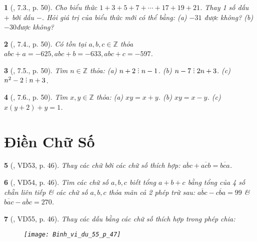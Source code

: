 \documentclass{article}
\newtheorem{baitoan}{}
\DeclareRobustCommand{\divby}{%
	\mathrel{\vbox{\baselineskip.65ex\lineskiplimit0pt\hbox{.}\hbox{.}\hbox{.}}}%
}
\begin{document}
\begin{baitoan}[\cite{TLCT_THCS_Toan_6_so_hoc}, 7.3., p. 50]
	Cho biểu thức $1 + 3 + 5 + 7 + \cdots + 17 + 19 + 21$. Thay 1 số dấu $+$ bởi dấu $-$. Hỏi giá trị của biểu thức mới có thể bằng: (a) $-31$ được không? (b) $-30$được không?
\end{baitoan}

\begin{baitoan}[\cite{TLCT_THCS_Toan_6_so_hoc}, 7.4., p. 50]
	Có tồn tại $a,b,c\in\mathbb{Z}$ thỏa $abc + a = -625,abc + b = -633,abc + c = -597$.
\end{baitoan}

\begin{baitoan}[\cite{TLCT_THCS_Toan_6_so_hoc}, 7.5., p. 50]
	Tìm $n\in\mathbb{Z}$ thỏa: (a) $n + 2\divby n - 1$. (b) $n - 7\divby2n + 3$. (c) $n^2 - 2\divby n + 3$.
\end{baitoan}

\begin{baitoan}[\cite{TLCT_THCS_Toan_6_so_hoc}, 7.6., p. 50]
	Tìm $x,y\in\mathbb{Z}$ thỏa: (a) $xy = x + y$. (b) $xy = x - y$. (c) $x(y + 2) + y = 1$.
\end{baitoan}


\section{Điền Chữ Số}

\begin{baitoan}[\cite{Binh_Toan_6_tap_1}, VD53, p. 46]
	Thay các chữ bởi các chữ số thích hợp: $\overline{abc} + \overline{acb} = \overline{bca}$.
\end{baitoan}

\begin{baitoan}[\cite{Binh_Toan_6_tap_1}, VD54, p. 46]
	Tìm các chữ số $a,b,c$ biết tổng $a + b + c$ bằng tổng của 4 số chẵn liên tiếp \& các chữ số $a,b,c$ thỏa mãn cả 2 phép trừ sau: $\overline{abc} - \overline{cba} = 99$ \& $\overline{bac} - \overline{abc} = 270$.
\end{baitoan}

\begin{baitoan}[\cite{Binh_Toan_6_tap_1}, VD55, p. 46]
	Thay các dấu {\bf*} bằng các chữ số thích hợp trong phép chia:
	\begin{figure}[H]
		\centering
		\texttt{[image: Binh\_vi\_du\_55\_p\_47]}
	\end{figure}
\end{baitoan}
\end{document}
